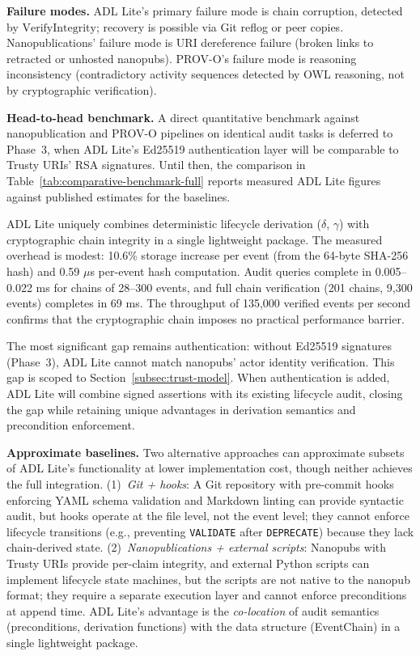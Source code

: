 \textbf{Failure modes.} ADL Lite's primary failure mode is chain corruption, detected by $\text{VerifyIntegrity}$; recovery is possible via Git reflog or peer copies. Nanopublications' failure mode is URI dereference failure (broken links to retracted or unhosted nanopubs). PROV-O's failure mode is reasoning inconsistency (contradictory activity sequences detected by OWL reasoning, not by cryptographic verification).

\textbf{Head-to-head benchmark.} A direct quantitative benchmark against nanopublication and PROV-O pipelines on identical audit tasks is deferred to Phase~3, when ADL Lite's Ed25519 authentication layer will be comparable to Trusty URIs' RSA signatures. Until then, the comparison in Table~\ref{tab:comparative-benchmark-full} reports measured ADL Lite figures against published estimates for the baselines.

ADL Lite uniquely combines deterministic lifecycle derivation ($\delta$, $\gamma$) with cryptographic chain integrity in a single lightweight package. The measured overhead is modest: 10.6\% storage increase per event (from the 64-byte SHA-256 hash) and 0.59 $\mu$s per-event hash computation. Audit queries complete in 0.005--0.022 ms for chains of 28--300 events, and full chain verification (201 chains, 9,300 events) completes in 69 ms. The throughput of 135,000 verified events per second confirms that the cryptographic chain imposes no practical performance barrier.

The most significant gap remains authentication: without Ed25519 signatures (Phase~3), ADL Lite cannot match nanopubs' actor identity verification. This gap is scoped to Section~\ref{subsec:trust-model}. When authentication is added, ADL Lite will combine signed assertions with its existing lifecycle audit, closing the gap while retaining unique advantages in derivation semantics and precondition enforcement.

\textbf{Approximate baselines.} Two alternative approaches can approximate subsets of ADL Lite's functionality at lower implementation cost, though neither achieves the full integration. (1)~\emph{Git + hooks}: A Git repository with pre-commit hooks enforcing YAML schema validation and Markdown linting can provide syntactic audit, but hooks operate at the file level, not the event level; they cannot enforce lifecycle transitions (e.g., preventing \texttt{VALIDATE} after \texttt{DEPRECATE}) because they lack chain-derived state. (2)~\emph{Nanopublications + external scripts}: Nanopubs with Trusty URIs provide per-claim integrity, and external Python scripts can implement lifecycle state machines, but the scripts are not native to the nanopub format; they require a separate execution layer and cannot enforce preconditions at append time. ADL Lite's advantage is the \emph{co-location} of audit semantics (preconditions, derivation functions) with the data structure (EventChain) in a single lightweight package.
